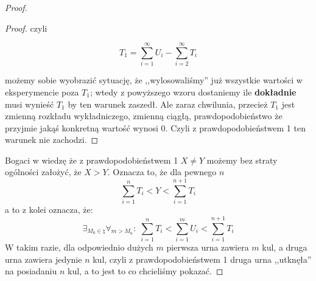 \begin{proof}
\begin{proof}
        czyli 
        
        \[ 
            T_1 = \sum_{i=1}^{\infty} U_i - \sum_{i=2}^{\infty} T_i 
        \]
        
        możemy sobie wyobrazić sytuację, że ,,wylosowaliśmy'' już wszystkie wartości w eksperymencie poza \(T_1\); wtedy z powyższego wzoru dostaniemy ile \textbf{dokładnie} musi wynieść \(T_1\) by ten warunek zaszedł. Ale zaraz chwilunia, przecież \(T_1\) jest zmienną rozkładu wykładniczego, zmienną ciągłą, prawdopodobieństwo że przyjmie jakąś konkretną wartość wynosi 0. Czyli z prawdopodobieństwem 1 ten warunek nie zachodzi.
    \end{proof}
    
   
    
    Bogaci w wiedzę że z prawdopodobieństwem 1 \(X \not = Y\) możemy bez straty ogólności założyć, że \( X > Y \). Oznacza to, że dla pewnego \( n \)
    \[
        \sum_{i=1}^n T_i < Y < \sum_{i=1}^{n+1} T_i
    \]
    a to z kolei oznacza, że:
    \[
        \exists_{M_0 \in \natural} \forall_{m > M_0}: \; \sum_{i=1}^n T_i < \sum_{i=1}^m U_i < \sum_{i=1}^{n+1} T_i
    \]
    W takim razie, dla odpowiednio dużych \( m \) pierwsza urna zawiera \( m \) kul, a druga urna zawiera jedynie \( n \) kul, czyli z prawdopodobieństwem 1 druga urna ,,utknęła'' na posiadaniu \( n \) kul, a to jest to co chcieliśmy pokazać.
\end{proof}